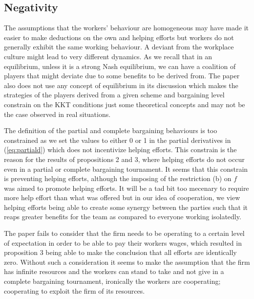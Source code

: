 \documentclass[a4paper,10pt]{article}
\theoremstyle{definition}
\begin{document}
\subsection*{Negativity}

The assumptions that the workers' behaviour are homogeneous may have made it easier to make deductions on the own and helping efforts but workers do not generally exhibit the same working behaviour. A deviant from the workplace culture might lead to very different dynamics. As we recall that in an equilibrium, unless it is a strong Nash equilibrium, we can have a coalition of players that might deviate due to some benefits to be derived from. The paper also does not use any concept of equilibrium in its discussion which makes the strategies of the players derived from a given scheme and bargaining level constrain on the KKT conditions just some theoretical concepts and may not be the case observed in real situations.

The definition of the partial and complete bargaining behaviours is too constrained as we set the values to either 0 or 1 in the partial derivatives in (\ref{eq:partiald}) which does not incentivize helping efforts. This constrain is the reason for the results of propositions 2 and 3, where helping efforts do not occur even in a partial or complete bargaining tournament.  It seems that this constrain is preventing  helping efforts, although the imposing of the restriction (b) on $f$ was aimed to promote helping efforts. It will be a tad bit too mecenary to require more help effort than what was offered but in our idea of cooperation, we view helping efforts being able to create some synergy between the parties such that it reaps greater benefits for the team as compared to everyone working isolatedly.

The paper fails to consider that the firm needs to be operating to a certain level of expectation in order to be able to pay their workers wages, which resulted in proposition 3 being able to make the conclusion that all efforts are identically zero. Without such a consideration it seems to make the assumption that the firm has infinite resources and the workers can stand to take and not give in a complete bargaining tournament, ironically the workers are cooperating; cooperating to exploit the firm of its resources.
\end{document}
